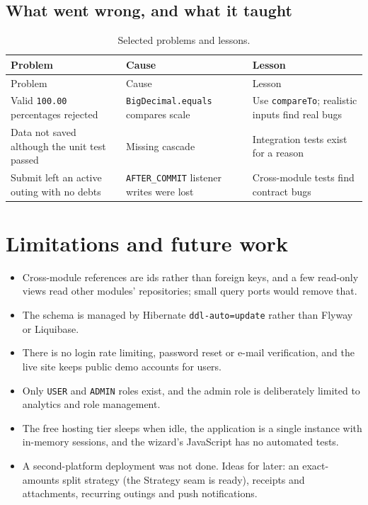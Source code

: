 \documentclass[10pt,a4paper]{article}
\newcommand{\code}[1]{\texttt{#1}}
\begin{document}
\subsection{What went wrong, and what it taught}

{\small
\begin{longtable}{@{}>{\raggedright\arraybackslash}p{4.7cm}>{\raggedright\arraybackslash}p{4.2cm}>{\raggedright\arraybackslash}p{6.4cm}@{}}
\caption{Selected problems and lessons.}\\
\toprule
Problem & Cause & Lesson \\
\midrule
\endfirsthead
\toprule
Problem & Cause & Lesson \\
\midrule
\endhead
\bottomrule
\endfoot
Valid \code{100.00} percentages rejected & \code{BigDecimal.equals} compares scale & Use \code{compareTo}; realistic inputs find real bugs \\
Data not saved although the unit test passed & Missing cascade & Integration tests exist for a reason \\
Submit left an active outing with no debts & \code{AFTER\_COMMIT} listener writes were lost & Cross-module tests find contract bugs \\
\end{longtable}}

\section{Limitations and future work}

\begin{itemize}
\item Cross-module references are ids rather than foreign keys, and a few read-only views read other modules'
  repositories; small query ports would remove that.
\item The schema is managed by Hibernate \code{ddl-auto=update} rather than Flyway or Liquibase.
\item There is no login rate limiting, password reset or e-mail verification, and the live site keeps public demo
  accounts for users.
\item Only \code{USER} and \code{ADMIN} roles exist, and the admin role is deliberately limited to analytics and role
  management.
\item The free hosting tier sleeps when idle, the application is a single instance with in-memory sessions, and the
  wizard's JavaScript has no automated tests.
\item A second-platform deployment was not done. Ideas for later: an exact-amounts split strategy (the Strategy seam is
  ready), receipts and attachments, recurring outings and push notifications.
\end{itemize}
\end{document}
